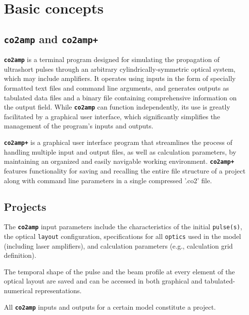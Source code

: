 \chapter{Basic concepts}

\section{\textbf{\texttt{co2amp}} and \textbf{\texttt{co2amp+}}}
\textbf{\texttt{co2amp}} is a terminal program designed for simulating the propagation of ultrashort pulses through an arbitrary cylindrically-symmetric optical system, which may include  amplifiers. It operates using inputs in the form of specially formatted text files and command line arguments, and generates outputs as tabulated data files and a binary file containing comprehensive information on the output field. While \textbf{\texttt{co2amp}} can function independently, its use is greatly facilitated by a graphical user interface, which significantly simplifies the management of the program’s inputs and outputs.

\textbf{\texttt{co2amp+}} is a graphical user interface program that streamlines the process of handling multiple input and output files, as well as calculation parameters, by maintaining an organized and easily navigable working environment. \textbf{\texttt{co2amp+}} features functionality for saving and recalling the entire file structure of a project along with command line parameters in a single compressed '.co2' file.


\section{Projects}
The \textbf{\texttt{co2amp}} input parameters include the characteristics of the initial \texttt{pulse(s)}, the optical \texttt{layout} configuration, specifications for all \texttt{optics} used in the model (including laser amplifiers), and calculation parameters (e.g., calculation grid definition).

The temporal shape of the pulse and the beam profile at every element of the optical layout are saved and can be accessed in both graphical and tabulated-numerical representations.

All \textbf{\texttt{co2amp}} inputs and outputs for a certain model constitute a project.

